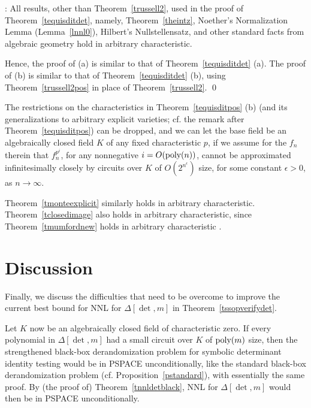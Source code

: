 \documentclass[11pt]{article}
\begin{document}
:
All results, other than Theorem~\ref{trussell2},
used in the proof of Theorem~\ref{tequisditdet},
 namely, Theorem~\ref{theintz}, Noether's Normalization Lemma
(Lemma~\ref{lnnl0}),  Hilbert's Nullstellensatz,  and other standard facts from algebraic 
geometry hold in  arbitrary  characteristic. 

Hence, 
the proof of (a) is similar to that of Theorem~\ref{tequisditdet} (a).
The proof of (b) is similar to that of  Theorem~\ref{tequisditdet} (b),
using Theorem~\ref{trussell2pos} in place of Theorem~\ref{trussell2}. 
 \qed 


 The restrictions on the characteristics in
Theorem~\ref{tequisditpos} (b) (and its generalizations to arbitrary explicit varieties; cf. 
the remark after Theorem~\ref{tequisditpos})
can be dropped, and we can let the
base field be an algebraically closed field $K$ of any fixed 
characteristic $p$,
if we assume for the $f_n$ therein  that 
$f_n^{p^i}$, for any nonnegative $i=O({\mbox {poly}}(n))$, 
cannot be approximated infinitesimally closely 
by circuits over $K$  of  
$O(2^{n^\epsilon})$ size,  for some constant $\epsilon > 0$,
as $n \rightarrow \infty$.


Theorem~\ref{tmonteexplicit} similarly holds in arbitrary characteristic.
Theorem~\ref{tclosedimage}   also holds in  arbitrary characteristic, since 
Theorem~\ref{tmumfordnew} holds in arbitrary characteristic \cite{mumford}.


%
\section{Discussion} \label{sdiscuss}
Finally, we discuss the difficulties that need to be overcome  to improve
the current best bound for NNL for $\Delta[\det,m]$
in  Theorem~\ref{tssopverifydet}.

Let $K$ now be an algebraically closed field of characteristic zero.
If  every polynomial  in $\Delta[\det,m]$ had  
a small circuit over  $K$ of ${\mbox {poly}}(m)$ size, 
then the strengthened black-box derandomization problem for symbolic determinant identity 
testing would be  in PSPACE unconditionally, 
like the standard black-box derandomization problem (cf. Proposition~\ref{pstandard}), 
with essentially  the same proof. 
By (the proof of) 
Theorem~\ref{tnnldetblack}, NNL for $\Delta[\det,m]$  would then be in PSPACE unconditionally.
\end{document}
